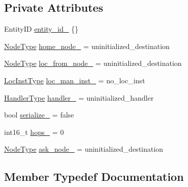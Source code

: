 \subsection*{Private Attributes}
\begin{DoxyCompactItemize}
\item 
Entity\+ID \hyperlink{structvt_1_1location_1_1_entity_msg_a7c50fcdb28e43633811173c6850380f2}{entity\+\_\+id\+\_\+} \{\}
\item 
\hyperlink{namespacevt_a866da9d0efc19c0a1ce79e9e492f47e2}{Node\+Type} \hyperlink{structvt_1_1location_1_1_entity_msg_a013a64971bd245f15f12aed3609d27e9}{home\+\_\+node\+\_\+} = uninitialized\+\_\+destination
\item 
\hyperlink{namespacevt_a866da9d0efc19c0a1ce79e9e492f47e2}{Node\+Type} \hyperlink{structvt_1_1location_1_1_entity_msg_a4e1bc853e380b513f04eddb25f6e0cd7}{loc\+\_\+from\+\_\+node\+\_\+} = uninitialized\+\_\+destination
\item 
\hyperlink{namespacevt_1_1location_a4db6456e8024af2d23fc5ae560fef866}{Loc\+Inst\+Type} \hyperlink{structvt_1_1location_1_1_entity_msg_a6a4e4b87147e3ce6b2c48c21e51d9995}{loc\+\_\+man\+\_\+inst\+\_\+} = no\+\_\+loc\+\_\+inst
\item 
\hyperlink{namespacevt_af64846b57dfcaf104da3ef6967917573}{Handler\+Type} \hyperlink{structvt_1_1location_1_1_entity_msg_a13540b561e587b92c4ff43656e022bb0}{handler\+\_\+} = uninitialized\+\_\+handler
\item 
bool \hyperlink{structvt_1_1location_1_1_entity_msg_a9eddacd500fc64877ee8932aad5a42fe}{serialize\+\_\+} = false
\item 
int16\+\_\+t \hyperlink{structvt_1_1location_1_1_entity_msg_a7703bd3911f04d9c0eff0eab58bf677c}{hops\+\_\+} = 0
\item 
\hyperlink{namespacevt_a866da9d0efc19c0a1ce79e9e492f47e2}{Node\+Type} \hyperlink{structvt_1_1location_1_1_entity_msg_ae1cae8c818d70070238c0f5b975e2a80}{ask\+\_\+node\+\_\+} = uninitialized\+\_\+destination
\end{DoxyCompactItemize}


\subsection{Member Typedef Documentation}
\mbox{\label{structvt_1_1location_1_1_entity_msg_a186637100a628eb04cb00127f5579210}} 
